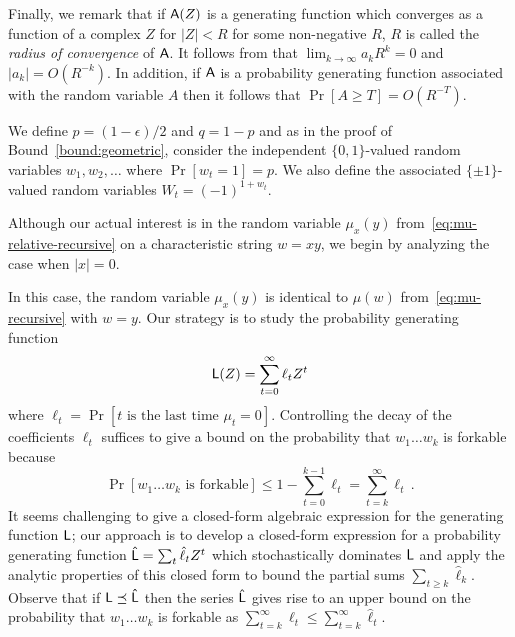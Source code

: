   Finally, we remark that
  if $\mathsf{A}(Z)$ is a generating function which converges as a
  function of a complex $Z$ for $|Z| < R$ for some non-negative $R$, 
  $R$ is called the \emph{radius of convergence} of $\mathsf{A}$.  
  It follows from \citep[Theorem 2.19]{WilfGF} that 
  $\lim_{k \rightarrow \infty} {a_k}R^k = 0$ and $|a_k| = O(R^{-k})$. 
	In addition, if $\mathsf{A}$ is a probability generating function associated with the
  random variable $A$ then it follows that
  $\Pr[A \geq T] = O(R^{-T})$.
  
  We define $p = (1 - \epsilon)/2$ and $q = 1 - p$ and 
  as in the proof of Bound~\ref{bound:geometric},
  consider the independent $\{0,1\}$-valued random variables
  $w_1, w_2, \ldots$ where $\Pr[w_t = 1] = p$. We also define the
  associated $\{\pm1\}$-valued random variables $W_t =
  (-1)^{1+w_t}$.
	
  
	Although our actual interest is in the random variable $\mu_x(y)$ 
	from~\eqref{eq:mu-relative-recursive} on a characteristic string $w=xy$, 
  we begin by analyzing the case when $|x|=0$. 

  In this case, the random variable $\mu_x(y)$ is identical to $\mu(w)$ 
  from~\eqref{eq:mu-recursive} with $w = y$. 
	Our strategy is to study the probability generating
  function
  \[
    \mathsf{L}(Z) = \sum_{t = 0}^\infty \ell_t Z^t
  \]
  where $\ell_t = \Pr[\text{$t$ is the last time $\mu_t =
    0$}]$. Controlling the decay of the coefficients $\ell_t$ suffices
  to give a bound on the probability that $w_1\ldots w_k$ is forkable
  because
  \[
    \Pr[\text{$w_1 \ldots w_k$ is forkable}] \leq 1 - \sum_{t =
      0}^{k-1} \ell_t = \sum_{t = k}^\infty \ell_t\,.
  \]
  It seems challenging to give a closed-form algebraic expression for
  the generating function $\mathsf{L}$; our approach is to develop a
  closed-form expression for a probability generating function
  $\mathsf{\hat{L}} = \sum_t \hat{\ell}_t Z^t$ which stochastically
  dominates $\mathsf{L}$ and apply the analytic properties of this closed
  form to bound the partial sums $\sum_{t \geq k} \hat{\ell}_k$.
  Observe that if $\mathsf{L} \preceq \mathsf{\hat{L}}$ then the series
  $\mathsf{\hat{L}}$ gives rise to an upper bound on the probability that
  $w_1\ldots w_k$ is forkable as
  $\sum_{t=k}^\infty \ell_t \leq \sum_{t=k}^\infty \hat{\ell}_t$.

